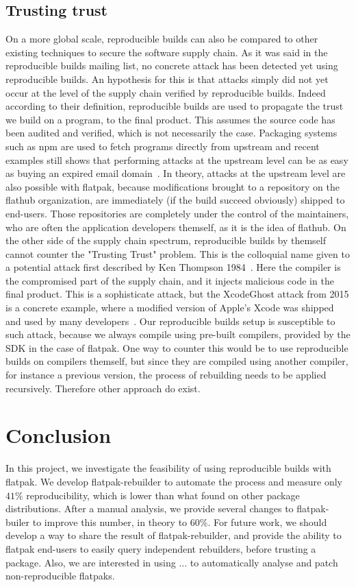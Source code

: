 \documentclass[a4paper,11pt,oneside]{report}
\theoremstyle{definition}
\newcommand{\sysname}{flatpak-rebuilder\xspace}
\newcommand{\rb}{reproducible builds\xspace}
\newcommand{\fp}{flatpak\xspace}
\newcommand{\fh}{flathub\xspace}
\newcommand{\fb}{flatpak-builer\xspace}
\begin{document}
\section{Trusting trust}
On a more global scale, \rb can also be compared to other existing techniques
to secure the software supply chain. As it was said in the \rb mailing list, no
concrete attack has been detected yet using \rb. An hypothesis for this is that
attacks simply did not yet occur at the level of the supply chain verified by
\rb. Indeed according to their definition, \rb are used to propagate the trust
we build on a program, to the final product. This assumes the source code has
been audited and verified, which is not necessarily the case. Packaging systems
such as npm are used to fetch programs directly from upstream and recent
examples still shows that performing attacks at the upstream level can be as
easy as buying an expired email domain~\cite{npm:ptdr}.
In theory, attacks at the upstream level are also possible with \fp, because
modifications brought to a repository on the \fh organization, are immediately
(if the build succeed obviously) shipped to end-users. Those repositories are
completely under the control of the maintainers, who are often the application
developers themself, as it is the idea of \fh.
On the other side of the supply chain spectrum, \rb by themself cannot counter
the "Trusting Trust" problem. This is the colloquial name given to a potential
attack first described by Ken Thompson 1984~\cite{thompson1984}. Here the
compiler is the compromised part of the supply chain, and it injects malicious
code in the final product. This is a sophisticate attack, but the XcodeGhost
attack from 2015 is a concrete example, where a modified version of Apple's
Xcode was shipped and used by many developers~\cite{enwiki:1054394297}. Our \rb
setup is susceptible to such attack, because we always compile using pre-built
compilers, provided by the SDK in the case of \fp. One way to counter this would
be to use \rb on compilers themself, but since they are compiled using another
compiler, for instance a previous version, the process of rebuilding needs to
be applied recursively. Therefore other approach do exist.

\chapter{Conclusion}

In this project, we investigate the feasibility of using \rb with \fp. We
develop \sysname to automate the process and measure only $41\%$
reproducibility, which is lower than what found on other package distributions.
After a manual analysis, we provide several changes to \fb to improve this
number, in theory to $60\%$. For future work, we should develop a way to share
the result of \sysname, and provide the ability to \fp end-users to easily
query independent rebuilders, before trusting a package. Also, we are
interested in using ... to automatically analyse and patch non-reproducible
flatpaks.

\cleardoublepage
{}
{}
\printbibliography
\end{document}
